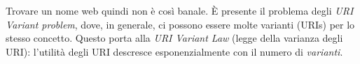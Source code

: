 Trovare un nome web quindi non \`e cos\`i banale. \`E presente il problema degli \textit{URI Variant problem}, dove, in generale, ci possono essere molte varianti (URIs) per lo stesso concetto. Questo porta alla \textit{URI Variant Law} (legge della varianza degli URI): l'utilit\`a degli URI descresce esponenzialmente con il numero di \textit{varianti}.
